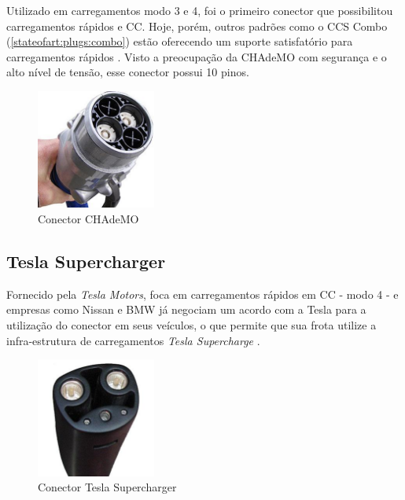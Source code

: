         Utilizado em carregamentos modo 3 e 4, foi o primeiro conector que possibilitou carregamentos rápidos e \ac{CC}. Hoje, porém, outros padrões como o CCS Combo (\ref{stateofart:plugs:combo}) estão oferecendo um suporte satisfatório para carregamentos rápidos \cite{ieee-review-evse}. Visto a preocupação da CHAdeMO com segurança e o alto nível de tensão, esse conector possui 10 pinos.

        \begin{figure}[H]
          \begin{center}
            \includegraphics[width=0.35\textwidth,natwidth=300,natheight=300]{assets/images/connectors-chademo.jpg}
            \caption{Conector CHAdeMO}
            \label{fig:chademo}
          \end{center}
        \end{figure}

      \subsection{Tesla Supercharger}
      \label{stateofart:plugs:tesla}

        Fornecido pela \textit{Tesla Motors}, foca em carregamentos rápidos em \ac{CC} - modo 4 - e empresas como Nissan e BMW já negociam um acordo com a Tesla para a utilização do conector em seus veículos, o que permite que sua frota utilize a infra-estrutura de carregamentos \textit{Tesla Supercharge} \cite{ieee-review-evse}.

        \begin{figure}[H]
          \begin{center}
            \includegraphics[width=0.35\textwidth,natwidth=300,natheight=300]{assets/images/connectors-tesla.jpg}
            \caption{Conector Tesla Supercharger}
            \label{fig:tesla}
          \end{center}
        \end{figure}

